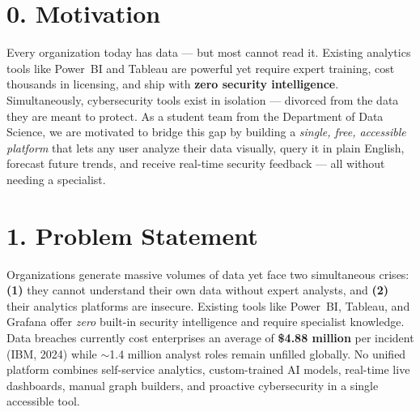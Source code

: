 \documentclass[10pt,twocolumn]{article}
\begin{document}

\section{0. Motivation}

Every organization today has data — but most cannot read it. Existing analytics
tools like Power~BI and Tableau are powerful yet require expert training, cost
thousands in licensing, and ship with \textbf{zero security intelligence}.
Simultaneously, cybersecurity tools exist in isolation — divorced from the data
they are meant to protect. As a student team from the Department of Data Science,
we are motivated to bridge this gap by building a \textit{single, free, accessible
platform} that lets any user analyze their data visually, query it in plain English,
forecast future trends, and receive real-time security feedback — all without
needing a specialist.

\section{1. Problem Statement}

Organizations generate massive volumes of data yet face two simultaneous crises:
\textbf{(1)} they cannot understand their own data without expert analysts, and
\textbf{(2)} their analytics platforms are insecure. Existing tools like Power~BI,
Tableau, and Grafana offer \textit{zero} built-in security intelligence and require
specialist knowledge. Data breaches currently cost enterprises an average of
\textbf{\$4.88 million} per incident (IBM, 2024) while $\sim$1.4 million analyst
roles remain unfilled globally. No unified platform combines self-service analytics,
custom-trained AI models, real-time live dashboards, manual graph builders, and
proactive cybersecurity in a single accessible tool.
\end{document}
